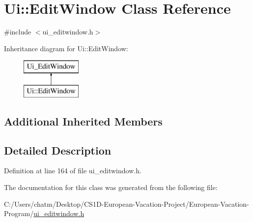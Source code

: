 \hypertarget{class_ui_1_1_edit_window}{}\section{Ui\+::Edit\+Window Class Reference}
\label{class_ui_1_1_edit_window}


{\ttfamily \#include $<$ui\+\_\+editwindow.\+h$>$}

Inheritance diagram for Ui\+::Edit\+Window\+:\begin{figure}[H]
\begin{center}
\leavevmode
\includegraphics[height=2.000000cm]{class_ui_1_1_edit_window}
\end{center}
\end{figure}
\subsection*{Additional Inherited Members}


\subsection{Detailed Description}


Definition at line 164 of file ui\+\_\+editwindow.\+h.



The documentation for this class was generated from the following file\+:\begin{DoxyCompactItemize}
\item 
C\+:/\+Users/chatm/\+Desktop/\+C\+S1\+D-\/\+European-\/\+Vacation-\/\+Project/\+European-\/\+Vacation-\/\+Program/\mbox{\hyperlink{ui__editwindow_8h}{ui\+\_\+editwindow.\+h}}\end{DoxyCompactItemize}
